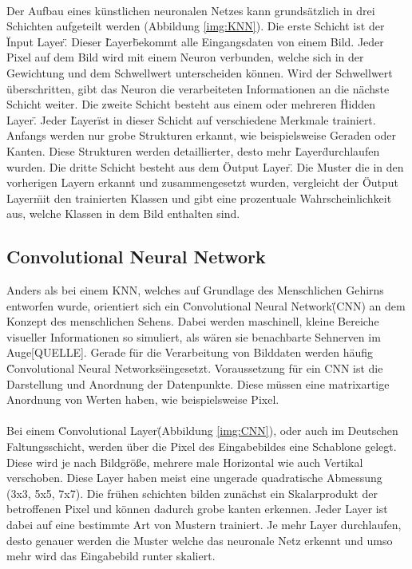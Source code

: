 \documentclass[a4paper,12pt,oneside]{article}
\begin{document}
\\
Der Aufbau eines künstlichen neuronalen Netzes kann grundsätzlich in drei Schichten aufgeteilt werden (Abbildung \ref{img:KNN}). Die erste Schicht ist der \"Input Layer\". Dieser \"Layer\" bekommt alle Eingangsdaten von einem Bild. Jeder Pixel auf dem Bild wird mit einem Neuron verbunden, welche sich in der Gewichtung und dem Schwellwert unterscheiden können. Wird der Schwellwert überschritten, gibt das Neuron die verarbeiteten Informationen an die nächste Schicht weiter. Die zweite Schicht besteht aus einem oder mehreren \"Hidden Layer\". Jeder \"Layer\" ist in dieser Schicht auf verschiedene Merkmale trainiert. Anfangs werden nur grobe Strukturen erkannt, wie beispielsweise Geraden oder Kanten. Diese Strukturen werden detaillierter, desto mehr \"Layer\" durchlaufen wurden. Die dritte Schicht besteht aus dem \"Output Layer\". Die Muster die in den vorherigen Layern erkannt und zusammengesetzt wurden, vergleicht der \"Output Layer\" mit den trainierten Klassen und gibt eine prozentuale Wahrscheinlichkeit aus, welche Klassen in dem Bild enthalten sind.


  \subsection{Convolutional Neural Network}
Anders als bei einem KNN, welches auf Grundlage des Menschlichen Gehirns entworfen wurde, orientiert sich ein \"Convolutional Neural Network\" (CNN) an dem Konzept des menschlichen Sehens. Dabei werden maschinell, kleine Bereiche visueller Informationen so simuliert, als wären sie benachbarte Sehnerven im Auge[QUELLE]. Gerade für die Verarbeitung von Bilddaten werden häufig \"Convolutional Neural Networks\" eingesetzt. Voraussetzung für ein CNN ist die Darstellung und Anordnung der Datenpunkte. Diese müssen eine matrixartige Anordnung von Werten haben, wie beispielsweise Pixel.
\\
\\
Bei einem \"Convolutional Layer\" (Abbildung \ref{img:CNN}), oder auch im Deutschen Faltungsschicht, werden über die Pixel des Eingabebildes eine Schablone gelegt. Diese wird je nach Bildgröße, mehrere male Horizontal wie auch Vertikal verschoben. Diese Layer haben meist eine ungerade quadratische Abmessung (3x3, 5x5, 7x7). Die frühen schichten bilden zunächst ein Skalarprodukt der betroffenen Pixel und können dadurch grobe kanten erkennen. Jeder Layer ist dabei auf eine bestimmte Art von Mustern trainiert. Je mehr Layer durchlaufen, desto genauer werden die Muster welche das neuronale Netz erkennt und umso mehr wird das Eingabebild runter skaliert.
\end{document}
